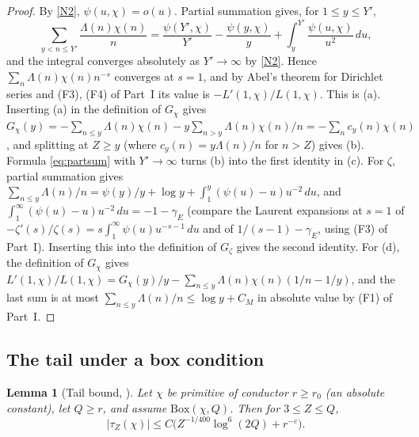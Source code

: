 \documentclass[11pt]{amsart}
\newcommand{\gE}{\gamma_{E}}
\theoremstyle{plain}
\newtheorem{lemma}[theorem]{Lemma}
\theoremstyle{definition}
\numberwithin{equation}{section}
\begin{document}
\begin{proof}
By \ref{N2}, $\psi(u,\chi)=o(u)$. Partial summation gives, for $1\le y\le Y'$,
\begin{equation}\label{eq:partsum}
\sum_{y<n\le Y'}\frac{\Lambda(n)\chi(n)}n=\frac{\psi(Y',\chi)}{Y'}-\frac{\psi(y,\chi)}y+\int_y^{Y'}\frac{\psi(u,\chi)}{u^2}\,du,
\end{equation}
and the integral converges absolutely as $Y'\to\infty$ by \ref{N2}. Hence
$\sum_n\Lambda(n)\chi(n)n^{-s}$ converges at $s=1$, and by Abel's theorem for Dirichlet series and
(F3), (F4) of Part~I its value is $-L'(1,\chi)/L(1,\chi)$. This is (a). Inserting (a) in the
definition of $G_\chi$ gives $G_\chi(y)=-\sum_{n\le y}\Lambda(n)\chi(n)-y\sum_{n>y}\Lambda(n)\chi(n)/n
=-\sum_nc_y(n)\chi(n)$, and splitting at $Z\ge y$ (where $c_y(n)=y\Lambda(n)/n$ for $n>Z$) gives (b).
Formula \eqref{eq:partsum} with $Y'\to\infty$ turns (b) into the first identity in (c).
For $\zeta$, partial summation gives $\sum_{n\le y}\Lambda(n)/n=\psi(y)/y+\log y+\int_1^y(\psi(u)-u)u^{-2}\,du$,
and $\int_1^\infty(\psi(u)-u)u^{-2}\,du=-1-\gE$ (compare the Laurent expansions at $s=1$ of
$-\zeta'(s)/\zeta(s)=s\int_1^\infty\psi(u)u^{-s-1}\,du$ and of $1/(s-1)-\gE$, using (F3) of Part~I).
Inserting this into the definition of $G_\zeta$ gives the second identity. For (d), the definition
of $G_\chi$ gives $L'(1,\chi)/L(1,\chi)=G_\chi(y)/y-\sum_{n\le y}\Lambda(n)\chi(n)(1/n-1/y)$, and the
last sum is at most $\sum_{n\le y}\Lambda(n)/n\le\log y+C_M$ in absolute value by (F1) of Part~I.
\end{proof}

\subsection{The tail under a box condition}

\begin{lemma}[Tail bound, ]\label{lem:tail}
Let $\chi$ be primitive of conductor $r\ge r_0$ (an absolute constant), let $Q\ge r$, and assume
$\mathrm{Box}(\chi,Q)$. Then for $3\le Z\le Q$,
\[
|\tau_Z(\chi)|\le C\bigl(Z^{-1/400}\log^6(2Q)+r^{-c}\bigr).
\]
\end{lemma}
\end{document}
